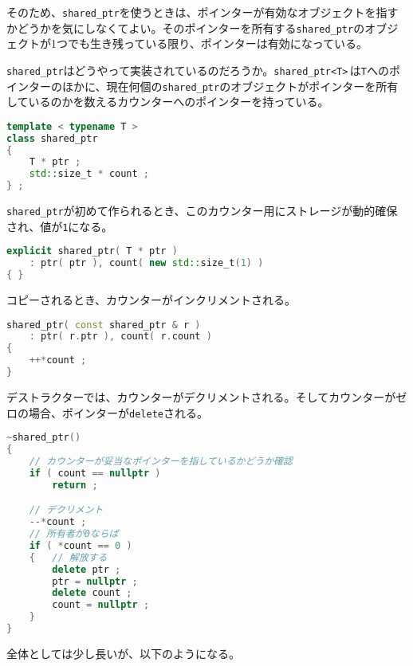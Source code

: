 そのため、\texttt{shared\_ptr}を使うときは、ポインターが有効なオブジェクトを指すかどうかを気にしなくてよい。そのポインターを所有する\texttt{shared\_ptr}のオブジェクトが1つでも生き残っている限り、ポインターは有効になっている。

\texttt{shared\_ptr}はどうやって実装されているのだろうか。\texttt{shared\_ptr<T>}\,は\texttt{T}へのポインターのほかに、現在何個の\texttt{shared\_ptr}のオブジェクトがポインターを所有しているのかを数えるカウンターへのポインターを持っている。

\begin{lstlisting}[language={C++}]
template < typename T >
class shared_ptr
{
    T * ptr ;
    std::size_t * count ;
} ;
\end{lstlisting}

\texttt{shared\_ptr}が初めて作られるとき、このカウンター用にストレージが動的確保され、値が\texttt{1}になる。

\begin{lstlisting}[language={C++}]
explicit shared_ptr( T * ptr )
    : ptr( ptr ), count( new std::size_t(1) )
{ }
\end{lstlisting}

コピーされるとき、カウンターがインクリメントされる。

\begin{lstlisting}[language={C++}]
shared_ptr( const shared_ptr & r )
    : ptr( r.ptr ), count( r.count )
{
    ++*count ;
}
\end{lstlisting}

デストラクターでは、カウンターがデクリメントされる。そしてカウンターがゼロの場合、ポインターが\texttt{delete}される。

\begin{lstlisting}[language={C++}]
~shared_ptr()
{
    // カウンターが妥当なポインターを指しているかどうか確認
    if ( count == nullptr )
        return ;

    // デクリメント
    --*count ;
    // 所有者が0ならば
    if ( *count == 0 )
    {   // 解放する
        delete ptr ;
        ptr = nullptr ;
        delete count ;
        count = nullptr ;
    }
}
\end{lstlisting}

全体としては少し長いが、以下のようになる。


